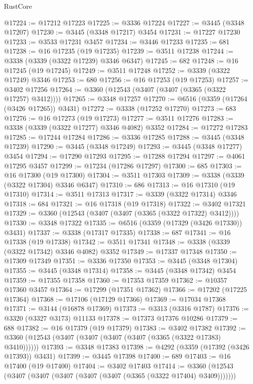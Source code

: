 \begin{lexlean}{RustCore}
\begin{coremodule}
@17224 := @17212 @17223
@17225 := @3336 @17224
@17227 := @3445 (@3348 @17207)
@17230 := @3445 (@3348 @17217) @3454
@17231 := @17227 @17230
@17233 := @3533 @17231 @3457
@17234 := @3446 @17233
@17235 := 681
@17238 := @16 @17235 (@19 @17235)
@17239 := @3511 @17238
@17244 := @3338 (@3339 (@3322 @17239) @3346 @6347)
@17245 := 682
@17248 := @16 @17245 (@19 @17245)
@17249 := @3511 @17248
@17252 := @3339 (@3322 @17249) @3346
@17253 := 680
@17256 := @16 @17253 (@19 @17253)
@17257 := @3402 @17256
@17264 := @3360 (@12543 (@3407 (@3407 (@3365 (@3322 @17257) @3412))))
@17265 := @3348 @17257
@17270 := @6516 (@3359 (@17264 (@3426 @17265)) @3431)
@17272 := @3338 (@17252 @17270)
@17273 := 683
@17276 := @16 @17273 (@19 @17273)
@17277 := @3511 @17276
@17283 := @3338 (@3339 (@3322 @17277) @3346 @4082) @3352
@17284 := @17272 @17283
@17285 := @17244 @17284
@17286 := @3336 @17285
@17288 := @3445 (@3348 @17239)
@17290 := @3445 (@3348 @17249)
@17293 := @3445 (@3348 @17277) @3454
@17294 := @17290 @17293
@17295 := @17288 @17294
@17297 := @4061 @17295 @3457
@17299 := @17234 (@17286 @17297)
@17300 := 685
@17303 := @16 @17300 (@19 @17300)
@17304 := @3511 @17303
@17309 := @3338 (@3339 (@3322 @17304) @3346 @6347)
@17310 := 686
@17313 := @16 @17310 (@19 @17310)
@17314 := @3511 @17313
@17317 := @3339 (@3322 @17314) @3346
@17318 := 684
@17321 := @16 @17318 (@19 @17318)
@17322 := @3402 @17321
@17329 := @3360 (@12543 (@3407 (@3407 (@3365 (@3322 @17322) @3412))))
@17330 := @3348 @17322
@17335 := @6516 (@3359 (@17329 (@3426 @17330)) @3431)
@17337 := @3338 (@17317 @17335)
@17338 := 687
@17341 := @16 @17338 (@19 @17338)
@17342 := @3511 @17341
@17348 := @3338 (@3339 (@3322 @17342) @3346 @4082) @3352
@17349 := @17337 @17348
@17350 := @17309 @17349
@17351 := @3336 @17350
@17353 := @3445 (@3348 @17304)
@17355 := @3445 (@3348 @17314)
@17358 := @3445 (@3348 @17342) @3454
@17359 := @17355 @17358
@17360 := @17353 @17359
@17362 := @10357 @17360 @3457
@17364 := @17299 (@17351 @17362)
@17366 := @17202 (@17225 @17364)
@17368 := @17106 (@17129 @17366)
@17369 := @17034 @17368
@17371 := @3144 (@16878 @17369)
@17373 := @3313 (@3316 @1787)
@17376 := @3320 (@3327 @3173) @11133
@17378 := @17373 @17376 @10286
@17379 := 688
@17382 := @16 @17379 (@19 @17379)
@17383 := @3402 @17382
@17392 := @3360 (@12543 (@3407 (@3407 (@3407 (@3407 (@3365 (@3322 @17383) @3410))))))
@17393 := @3348 @17383
@17398 := @4292 (@3359 (@17392 (@3426 @17393)) @3431)
@17399 := @3445 @17398
@17400 := 689
@17403 := @16 @17400 (@19 @17400)
@17404 := @3402 @17403
@17414 := @3360 (@12543 (@3407 (@3407 (@3407 (@3407 (@3407 (@3365 (@3322 @17404) @3409)))))))

\end{coremodule}
\end{lexlean}
